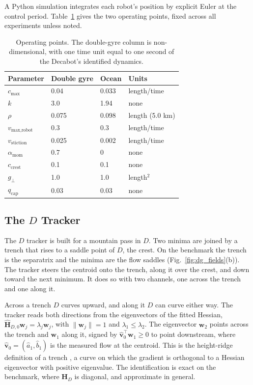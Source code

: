 \documentclass[lettersize,journal]{IEEEtran}
\begin{document}
A Python simulation integrates each robot's position by explicit Euler at
the control period. Table~\ref{tab:params} gives the two operating points,
fixed across all experiments unless noted.

\begin{table}[!t]
\caption{Operating points. The double-gyre column is non-dimensional,
with one time unit equal to one second of the Decabot's identified
dynamics.}
\label{tab:params}
\centering
\begin{tabular}{llll}
\hline
Parameter & Double gyre & Ocean & Units \\
\hline
$c_{\max}$              & 0.04  & 0.033  & length/time \\
$k$                     & 3.0   & 1.94   & none \\
$\rho$                  & 0.075 & 0.098  & length (5.0 km) \\
$v_{\text{max,robot}}$  & 0.3   & 0.3    & length/time \\
$v_{\text{stiction}}$   & 0.025 & 0.002  & length/time \\
$\alpha_{\text{mom}}$   & 0.7   & 0      & none \\
$c_{\mathrm{crest}}$    & 0.1   & 0.1    & none \\
$g_\perp$              & 1.0   & 1.0    & length$^2$ \\
$q_{\mathrm{cap}}$      & 0.03  & 0.03   & none \\
\hline
\end{tabular}
\end{table}

\subsection{The $D$ Tracker}
\label{sec:sep_controller}

The $D$ tracker is built for a mountain pass in $D$. Two minima are
joined by a trench that rises to a saddle point of $D$, the crest. On the
benchmark the trench is the separatrix and the minima are the flow saddles
(Fig.~\ref{fig:dg_fields}(b)). The tracker steers the centroid onto the
trench, along it over the crest, and down toward the next minimum. It
does so with two channels, one across the trench and one along it.

Across a trench $D$ curves upward, and along it $D$ can curve either way.
The tracker reads both directions from the eigenvectors of the fitted
Hessian, $\hat{\mathbf{H}}_{D,0}\mathbf{w}_j = \lambda_j \mathbf{w}_j$,
with $\|\mathbf{w}_j\| = 1$ and $\lambda_1 \leq \lambda_2$. The
eigenvector $\mathbf{w}_2$ points across the trench and $\mathbf{w}_1$
along it, signed by $\hat{\mathbf{v}}_0^\top \mathbf{w}_1 \geq 0$ to point
downstream, where $\hat{\mathbf{v}}_0 = (\hat{a}_1, \hat{b}_1)$ is the
measured flow at the centroid. This is the height-ridge definition of a
trench \cite{33}, a curve on which the gradient is orthogonal to a Hessian
eigenvector with positive eigenvalue. The identification is exact on the
benchmark, where $\mathbf{H}_D$ is diagonal, and approximate in general.
\end{document}
